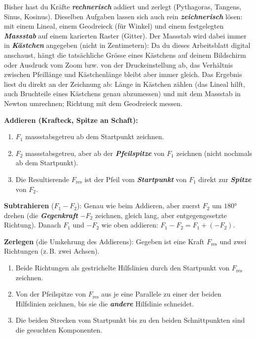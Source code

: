 \documentclass[addpoints,11pt,a4paper]{exam}
\begin{document}
\begin{theoriebox}
Bisher hast du Kräfte \textbf{\emph{rechnerisch}} addiert und zerlegt
(Pythagoras, Tangens, Sinus, Kosinus). Dieselben Aufgaben lassen sich
auch rein \textbf{\emph{zeichnerisch}} lösen: mit einem Lineal, einem
Geodreieck (für Winkel) und einem festgelegten
\textbf{\emph{Massstab}} auf einem karierten Raster (Gitter). Der
Massstab wird dabei immer in \textbf{\emph{Kästchen}} angegeben (nicht in
Zentimetern): Da du dieses Arbeitsblatt digital anschaust, hängt die
tatsächliche Grösse eines Kästchens auf deinem Bildschirm oder Ausdruck
vom Zoom bzw. von der Druckeinstellung ab, das Verhältnis zwischen
Pfeillänge und Kästchenlänge bleibt aber immer gleich. Das Ergebnis
liest du direkt an der Zeichnung ab: Länge in Kästchen zählen (das
Lineal hilft, auch Bruchteile eines Kästchens genau abzumessen) und mit
dem Massstab in Newton umrechnen; Richtung mit dem Geodreieck messen.

\textbf{Addieren (Krafteck, \glqq Spitze an Schaft\grqq{}):}
\begin{enumerate}[leftmargin=1.2cm,itemsep=0.15em]
  \item $F_1$ massstabsgetreu ab dem Startpunkt zeichnen.
  \item $F_2$ massstabsgetreu, aber ab der \textbf{\emph{Pfeilspitze}} von
  $F_1$ zeichnen (nicht nochmals ab dem Startpunkt).
  \item Die Resultierende $F_{\text{res}}$ ist der Pfeil vom
  \textbf{\emph{Startpunkt}} von $F_1$ direkt zur \textbf{\emph{Spitze}}
  von $F_2$.
\end{enumerate}

\textbf{Subtrahieren} ($F_1-F_2$): Genau wie beim Addieren, aber zuerst
$F_2$ um $\ang{180}$ drehen (die \textbf{\emph{Gegenkraft}} $-F_2$
zeichnen, gleich lang, aber entgegengesetzte Richtung). Danach $F_1$ und
$-F_2$ wie oben addieren: $F_1-F_2 = F_1+(-F_2)$.

\textbf{Zerlegen} (die Umkehrung des Addierens): Gegeben ist eine Kraft
$F_{\text{res}}$ und zwei Richtungen (z.\,B. zwei Achsen).
\begin{enumerate}[leftmargin=1.2cm,itemsep=0.15em]
  \item Beide Richtungen als gestrichelte Hilfslinien durch den
  Startpunkt von $F_{\text{res}}$ zeichnen.
  \item Von der Pfeilspitze von $F_{\text{res}}$ aus je eine Parallele zu
  einer der beiden Hilfslinien zeichnen, bis sie die \textbf{\emph{andere}}
  Hilfslinie schneidet.
  \item Die beiden Strecken vom Startpunkt bis zu den beiden
  Schnittpunkten sind die gesuchten Komponenten.
\end{enumerate}


\end{theoriebox}
\end{document}
